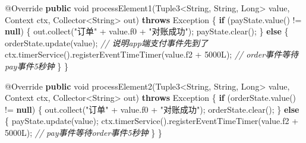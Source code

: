 \documentclass[cn,11pt,chinese]{elegantbook}
\newenvironment{Shaded}{}{}
\newcommand{\AttributeTok}[1]{\textcolor[rgb]{0.49,0.56,0.16}{#1}}
\newcommand{\BuiltInTok}[1]{#1}
\newcommand{\CommentTok}[1]{\textcolor[rgb]{0.38,0.63,0.69}{\textit{#1}}}
\newcommand{\DataTypeTok}[1]{\textcolor[rgb]{0.56,0.13,0.00}{#1}}
\newcommand{\DecValTok}[1]{\textcolor[rgb]{0.25,0.63,0.44}{#1}}
\newcommand{\FunctionTok}[1]{\textcolor[rgb]{0.02,0.16,0.49}{#1}}
\newcommand{\KeywordTok}[1]{\textcolor[rgb]{0.00,0.44,0.13}{\textbf{#1}}}
\newcommand{\NormalTok}[1]{#1}
\newcommand{\StringTok}[1]{\textcolor[rgb]{0.25,0.44,0.63}{#1}}
\begin{document}
\begin{Shaded}
\begin{Highlighting}[]
        \AttributeTok{@Override}
        \KeywordTok{public} \DataTypeTok{void} \FunctionTok{processElement1}\NormalTok{(Tuple3\textless{}}\BuiltInTok{String}\NormalTok{, }\BuiltInTok{String}\NormalTok{, }\BuiltInTok{Long}\NormalTok{\textgreater{} value, }\BuiltInTok{Context}\NormalTok{ ctx, Collector\textless{}}\BuiltInTok{String}\NormalTok{\textgreater{} out) }\KeywordTok{throws} \BuiltInTok{Exception}\NormalTok{ \{}
            \KeywordTok{if}\NormalTok{ (payState.}\FunctionTok{value}\NormalTok{() != }\KeywordTok{null}\NormalTok{) \{}
\NormalTok{                out.}\FunctionTok{collect}\NormalTok{(}\StringTok{"订单"}\NormalTok{ + value.}\FunctionTok{f0}\NormalTok{ + }\StringTok{"对账成功"}\NormalTok{);}
\NormalTok{                payState.}\FunctionTok{clear}\NormalTok{();}
\NormalTok{            \} }\KeywordTok{else}\NormalTok{ \{}
\NormalTok{                orderState.}\FunctionTok{update}\NormalTok{(value); }\CommentTok{// 说明app端支付事件先到了}
\NormalTok{                ctx.}\FunctionTok{timerService}\NormalTok{().}\FunctionTok{registerEventTimeTimer}\NormalTok{(value.}\FunctionTok{f2}\NormalTok{ + }\DecValTok{5000L}\NormalTok{); }\CommentTok{// order事件等待pay事件5秒钟}
\NormalTok{            \}}
\NormalTok{        \}}

        \AttributeTok{@Override}
        \KeywordTok{public} \DataTypeTok{void} \FunctionTok{processElement2}\NormalTok{(Tuple3\textless{}}\BuiltInTok{String}\NormalTok{, }\BuiltInTok{String}\NormalTok{, }\BuiltInTok{Long}\NormalTok{\textgreater{} value, }\BuiltInTok{Context}\NormalTok{ ctx, Collector\textless{}}\BuiltInTok{String}\NormalTok{\textgreater{} out) }\KeywordTok{throws} \BuiltInTok{Exception}\NormalTok{ \{}
            \KeywordTok{if}\NormalTok{ (orderState.}\FunctionTok{value}\NormalTok{() != }\KeywordTok{null}\NormalTok{) \{}
\NormalTok{                out.}\FunctionTok{collect}\NormalTok{(}\StringTok{"订单"}\NormalTok{ + value.}\FunctionTok{f0}\NormalTok{ + }\StringTok{"对账成功"}\NormalTok{);}
\NormalTok{                orderState.}\FunctionTok{clear}\NormalTok{();}
\NormalTok{            \} }\KeywordTok{else}\NormalTok{ \{}
\NormalTok{                payState.}\FunctionTok{update}\NormalTok{(value);}
\NormalTok{                ctx.}\FunctionTok{timerService}\NormalTok{().}\FunctionTok{registerEventTimeTimer}\NormalTok{(value.}\FunctionTok{f2}\NormalTok{ + }\DecValTok{5000L}\NormalTok{); }\CommentTok{// pay事件等待order事件5秒钟}
\NormalTok{            \}}
\NormalTok{        \}}


\end{Highlighting}
\end{Shaded}
\end{document}
